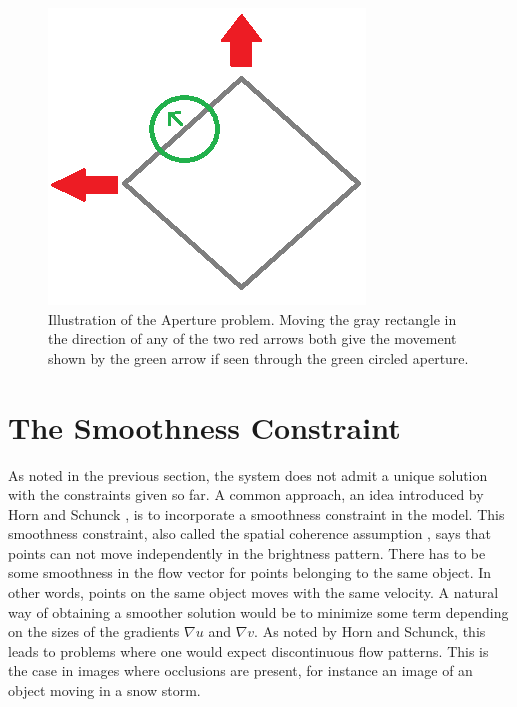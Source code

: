 \begin{figure}
    \centering
    \includegraphics[scale=0.5]{Figures/ApertureProblem.png}
    \caption{Illustration of the Aperture problem. Moving the gray rectangle in the direction of any of the two red arrows both give the movement shown by the green arrow if seen through the green circled aperture.}
    \label{ApertureProblem}
\end{figure}



\section{The Smoothness Constraint}
As noted in the previous section, the system does not admit a unique solution with the constraints given so far. A common approach, an idea introduced by Horn and Schunck \cite{HS}, is to incorporate a smoothness constraint in the model. This smoothness constraint, also called the spatial coherence assumption \cite{Black199675}, says that points can not move independently in the brightness pattern. There has to be some smoothness in the flow vector for points belonging to the same object. In other words, points on the same object moves with the same velocity. A natural way of obtaining a smoother solution would be to minimize some term depending on the sizes of the gradients $\nabla u$ and $\nabla v$. As noted by Horn and Schunck, this leads to problems where one would expect discontinuous flow patterns. This is the case in images where occlusions are present, for instance an image of an object moving in a snow storm.

